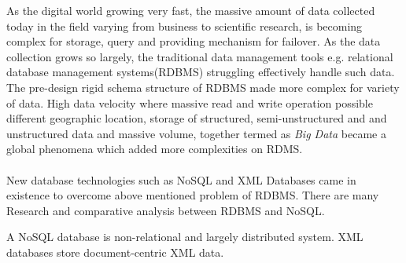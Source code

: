 As the digital world growing very fast, the massive amount of data collected today in the field varying from business to scientific research, is becoming complex for storage, query and providing mechanism for failover.  As the data collection grows so largely, the traditional data management tools e.g. relational database management systems(RDBMS) struggling effectively handle such data. The pre-design rigid schema structure of RDBMS made more complex for variety of data.  High data velocity where massive read and write operation possible different geographic location, storage of structured, semi-unstructured and and unstructured data and massive volume, together termed as  \textit{Big Data} became a global phenomena which added more complexities on RDMS.
\paragraph{}
New database technologies such as  NoSQL and  XML Databases came in existence to overcome above mentioned problem of RDBMS.  There are many Research and comparative analysis between RDBMS and NoSQL. \citep{xmark/original}

A NoSQL database is non-relational and largely distributed system. XML databases store document-centric XML data. 
